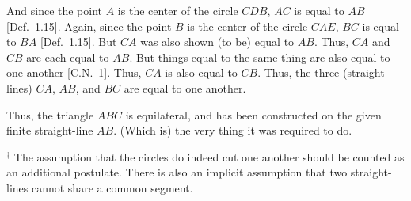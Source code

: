 \begin{Parallel}{}{}
{And since the point $A$ is the center of the circle $CDB$, $AC$ is equal to $AB$ [Def.~1.15]. Again,
since the point $B$ is the center of the circle $CAE$, $BC$ is equal to $BA$ [Def.~1.15]. But $CA$ 
was also shown (to be) equal to $AB$. Thus, $CA$ and $CB$ are each equal to $AB$. But things equal to the same thing are also equal to one another [C.N.~1]. Thus, $CA$ is also equal to $CB$. Thus, the three (straight-lines) $CA$, $AB$, and $BC$ are equal to one another.

Thus, the triangle $ABC$ is equilateral, and has been constructed on the
given finite straight-line $AB$. (Which is) the very thing it was required to do.}
\end{Parallel}
{\footnotesize
\noindent $^\dag$ The assumption that the circles do indeed cut one another should be counted as an additional 
postulate. There is also an implicit assumption that two straight-lines cannot share a common segment.}

